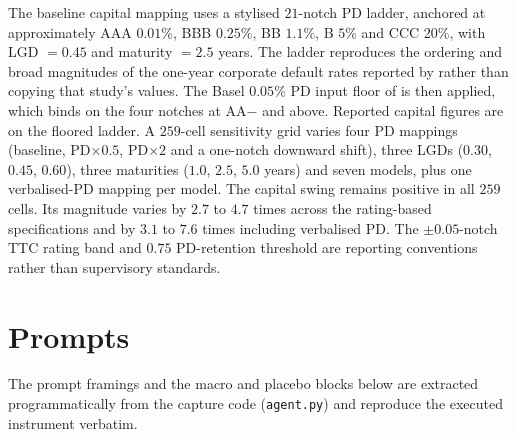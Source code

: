 \documentclass[a4paper,fleqn]{cas-sc}
\begin{document}
The baseline capital mapping uses a stylised $21$-notch PD ladder, anchored at approximately AAA
$0.01$\%, BBB $0.25$\%, BB $1.1$\%, B $5$\% and CCC $20$\%, with LGD $=0.45$ and maturity $=2.5$
years. The ladder reproduces the ordering and broad magnitudes of the one-year corporate default
rates reported by \citet{spratings2025} rather than copying that study's values. The Basel
$0.05$\% PD input floor of \citet[CRE32.4]{bcbs_cre32} is then applied, which binds on the four
notches at AA$-$ and above. Reported capital figures are on the floored ladder. A $259$-cell
sensitivity grid varies four PD mappings (baseline, PD$\times0.5$, PD$\times2$ and a one-notch downward shift), three LGDs ($0.30$, $0.45$, $0.60$), three maturities
($1.0$, $2.5$, $5.0$ years) and seven models, plus one verbalised-PD mapping per model. The capital
swing remains positive in all $259$ cells. Its magnitude varies by $2.7$ to $4.7$ times across the
rating-based specifications and by $3.1$ to $7.6$ times including verbalised PD. The
$\pm0.05$-notch TTC rating band and $0.75$ PD-retention threshold are reporting conventions rather
than supervisory standards.

\clearpage



\section{Prompts}\label{app:prompts}
The prompt framings and the macro and placebo blocks below are extracted programmatically from the
capture code (\texttt{agent.py}) and reproduce the executed instrument verbatim.


\printcredits



\end{document}
